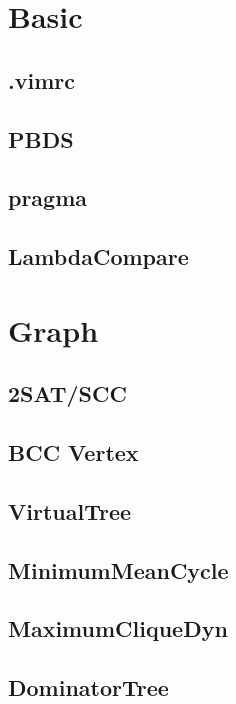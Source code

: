 \section{Basic}
	\subsection{.vimrc}
	
	\subsection{PBDS}
	
	\subsection{pragma}
	
	\subsection{LambdaCompare}
	
\section{Graph}
	\subsection{2SAT/SCC}
	
	\subsection{BCC Vertex}
	
	\subsection{VirtualTree}
	
	\subsection{MinimumMeanCycle}
	
	\subsection{MaximumCliqueDyn}
	
	\subsection{DominatorTree}
	
